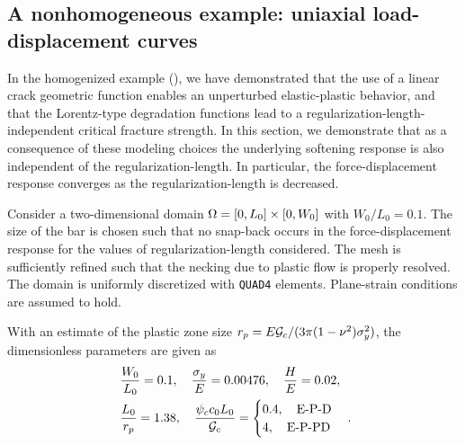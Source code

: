 \subsection{A nonhomogeneous example: uniaxial load-displacement curves}
\label{section: Chapter5/verification/nonhomogeneous}

In the homogenized example (), we have demonstrated that the use of a linear crack geometric function enables an unperturbed elastic-plastic behavior, and that the Lorentz-type degradation functions lead to a regularization-length-independent critical fracture strength. In this section, we demonstrate that as a consequence of these modeling choices the underlying softening response is also independent of the regularization-length. In particular, the force-displacement response converges as the regularization-length is decreased.



Consider a two-dimensional domain $\Omega = [0, L_0] \times [0, W_0]$ with $W_0 / L_0 = 0.1$. The size of the bar is chosen such that no snap-back occurs in the force-displacement response for the values of regularization-length considered. The mesh is sufficiently refined such that the necking due to plastic flow is properly resolved. The domain is uniformly discretized with \texttt{QUAD4} elements. Plane-strain conditions are assumed to hold.

With an estimate of the plastic zone size $r_p = E{\mathcal{G}_c}/(3 \pi (1-\nu^2) \sigma_y^2)$, the dimensionless parameters are given as
\begin{align*}
   & \ \dfrac{W_0}{L_0} = 0.1, \quad \dfrac{\sigma_y}{E} = 0.00476, \quad \dfrac{H}{E} = 0.02, \\
   & \ \dfrac{L_0}{r_p} = 1.38, \quad \dfrac{\psi_c c_0 L_0}{{\mathcal{G}_c}} =                            
  \begin{cases}
    0.4, \quad \text{E-P-D} \\
    4, \quad \text{E-P-PD}
  \end{cases}.
\end{align*}

